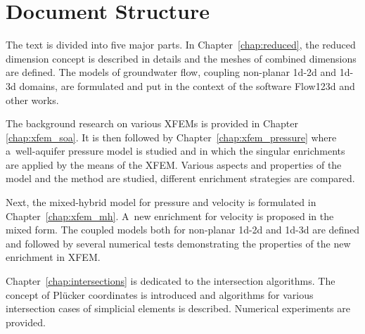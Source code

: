 




\section{Document Structure} \label{sec:structure}

The text is divided into five major parts.
In Chapter~\ref{chap:reduced}, the reduced dimension concept is described in details and the meshes of combined dimensions are defined.
The models of groundwater flow, coupling non-planar 1d-2d and 1d-3d domains, are formulated and put in the context of the software Flow123d 
and other works.


The background research on various XFEMs is provided in Chapter \ref{chap:xfem_soa}.
It is then followed by Chapter~\ref{chap:xfem_pressure} where a~well-aquifer pressure model is studied and
in which the singular enrichments are applied by the means of the XFEM.
Various aspects and properties of the model and the method are studied, different enrichment strategies are compared. 


Next, the mixed-hybrid model for pressure and velocity is formulated in Chapter~\ref{chap:xfem_mh}.
A~new enrichment for velocity is proposed in the mixed form.
The coupled models both for non-planar 1d-2d and 1d-3d are defined and followed by several
numerical tests demonstrating the properties of the new enrichment in XFEM.

Chapter~\ref{chap:intersections} is dedicated to the intersection algorithms.
The concept of Pl\"ucker coordinates is introduced and algorithms for various intersection cases
of simplicial elements is described. Numerical experiments are provided.


